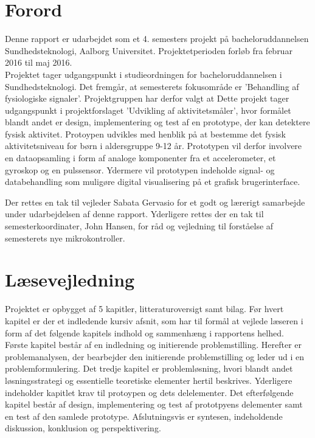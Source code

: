 \section*{Forord}
Denne rapport er udarbejdet som et 4. semesters projekt på bacheloruddannelsen Sundhedsteknologi, Aalborg Universitet. Projektetperioden forløb fra februar 2016 til maj 2016. \\
Projektet tager udgangspunkt i studieordningen for bacheloruddannelsen i Sundhedsteknologi. Det fremgår, at semesterets fokusområde er 'Behandling af fysiologiske signaler'. Projektgruppen har derfor valgt at 
Dette projekt tager udgangspunkt i projektforslaget 'Udvikling af aktivitetsmåler', hvor formålet blandt andet er design, implementering og test af en prototype, der kan detektere fysisk aktivitet. Protoypen udvikles med henblik på at bestemme det fysisk aktivitetsniveau for børn i aldersgruppe 9-12 år. Prototypen vil derfor involvere en dataopsamling i form af analoge komponenter fra et accelerometer, et gyroskop og en pulssensor. Ydermere vil prototypen indeholde signal- og databehandling som muligøre digital visualisering på et grafisk brugerinterface.

Der rettes en tak til vejleder Sabata Gervasio for et godt og lærerigt samarbejde under udarbejdelsen af denne rapport. Yderligere rettes der en tak til semesterkoordinater, John Hansen, for råd og vejledning til forståelse af semesterets nye mikrokontroller. 

\section*{Læsevejledning}
Projektet er opbygget af 5 kapitler, litteraturoversigt samt bilag. Før hvert kapitel er der et indledende kursiv afsnit, som har til formål at vejlede læseren i form af det følgende kapitels indhold og sammenhæng i rapportens helhed.\\
Første kapitel består af en indledning og initierende problemstilling. Herefter er problemanalysen, der bearbejder den initierende problemstilling og leder ud i en problemformulering. Det tredje kapitel er problemløsning, hvori blandt andet løsningsstrategi og essentielle teoretiske elementer hertil beskrives. Yderligere indeholder kapitlet krav til protoypen og dets delelementer. Det efterfølgende kapitel består af design, implementering og test af prototpyens delementer samt en test af den samlede prototype. Afslutningsvis er syntesen, indeholdende diskussion, konklusion og perspektivering.

